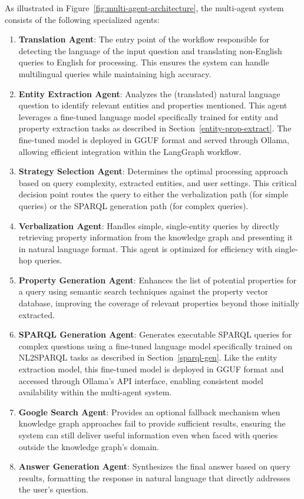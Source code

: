 As illustrated in Figure~\ref{fig:multi-agent-architecture}, the multi-agent system consists of the following specialized agents:

\begin{enumerate}
    \item \textbf{Translation Agent}: The entry point of the workflow responsible for detecting the language of the input question and translating non-English queries to English for processing. This ensures the system can handle multilingual queries while maintaining high accuracy.
    
    \item \textbf{Entity Extraction Agent}: Analyzes the (translated) natural language question to identify relevant entities and properties mentioned. This agent leverages a fine-tuned language model specifically trained for entity and property extraction tasks as described in Section~\ref{entity-prop-extract}. The fine-tuned model is deployed in GGUF format and served through Ollama, allowing efficient integration within the LangGraph workflow.
    
    \item \textbf{Strategy Selection Agent}: Determines the optimal processing approach based on query complexity, extracted entities, and user settings. This critical decision point routes the query to either the verbalization path (for simple queries) or the SPARQL generation path (for complex queries).
    
    \item \textbf{Verbalization Agent}: Handles simple, single-entity queries by directly retrieving property information from the knowledge graph and presenting it in natural language format. This agent is optimized for efficiency with single-hop queries.
    
    \item \textbf{Property Generation Agent}: Enhances the list of potential properties for a query using semantic search techniques against the property vector database, improving the coverage of relevant properties beyond those initially extracted.
    
    \item \textbf{SPARQL Generation Agent}: Generates executable SPARQL queries for complex questions using a fine-tuned language model specifically trained on NL2SPARQL tasks as described in Section~\ref{sparql-gen}. Like the entity extraction model, this fine-tuned model is deployed in GGUF format and accessed through Ollama's API interface, enabling consistent model availability within the multi-agent system.

    \item \textbf{Google Search Agent}: Provides an optional fallback mechanism when knowledge graph approaches fail to provide sufficient results, ensuring the system can still deliver useful information even when faced with queries outside the knowledge graph's domain.
    
    \item \textbf{Answer Generation Agent}: Synthesizes the final answer based on query results, formatting the response in natural language that directly addresses the user's question.
\end{enumerate}

